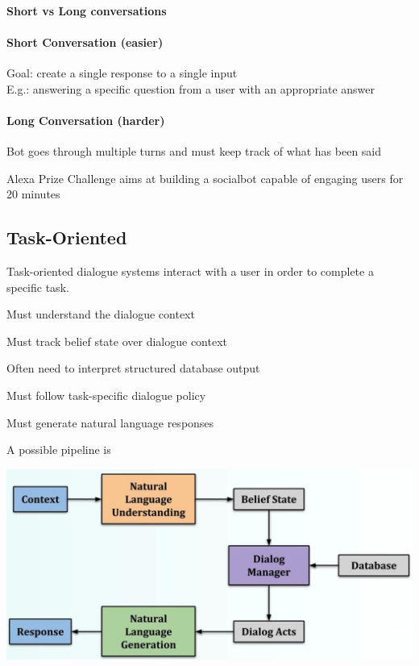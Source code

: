 \documentclass[10pt]{report}
\begin{document}
\paragraph{Short vs Long conversations}
\begin{multicols}{2}
\paragraph{Short Conversation (easier)}
\begin{list}{}{}
	\item Goal: create a single response to a single input\\
	E.g.: answering a specific question from a user with an appropriate answer
\end{list}
\paragraph{Long Conversation (harder)}
\begin{list}{}{}
	\item Bot goes through multiple turns and must keep track of what has been said
	\item Alexa Prize Challenge aims at building a socialbot capable of engaging users for 20 minutes
\end{list}
\end{multicols}
\pagebreak
\subsection{Task-Oriented}
Task-oriented dialogue systems interact with a user in order to complete a specific task.
\begin{list}{}{}
	\item Must understand the dialogue context
	\item Must track belief state over dialogue context
	\item Often need to interpret structured database output
	\item Must follow task-specific dialogue policy
	\item Must generate natural language responses
\end{list}
A possible pipeline is
\begin{center}
	\includegraphics[scale=0.33]{116.png}
\end{center}
\end{document}
